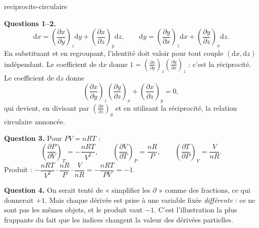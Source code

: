\begin{exo}{reciprocite-circulaire}
\begin{solution}
\textbf{Questions 1--2.}
\[
\mathrm{d}x = \left(\frac{\partial x}{\partial y}\right)_z\mathrm{d}y + \left(\frac{\partial x}{\partial z}\right)_y\mathrm{d}z, \qquad
\mathrm{d}y = \left(\frac{\partial y}{\partial x}\right)_z\mathrm{d}x + \left(\frac{\partial y}{\partial z}\right)_x\mathrm{d}z.
\]
En substituant et en regroupant, l'identité doit valoir pour tout couple $(\mathrm{d}x, \mathrm{d}z)$ indépendant. Le coefficient de $\mathrm{d}x$ donne $1 = \left(\frac{\partial x}{\partial y}\right)_z\left(\frac{\partial y}{\partial x}\right)_z$ : c'est la réciprocité. Le coefficient de $\mathrm{d}z$ donne
\[
\left(\frac{\partial x}{\partial y}\right)_z\left(\frac{\partial y}{\partial z}\right)_x + \left(\frac{\partial x}{\partial z}\right)_y = 0,
\]
qui devient, en divisant par $\left(\frac{\partial x}{\partial z}\right)_y$ et en utilisant la réciprocité, la relation circulaire annoncée.

\textbf{Question 3.} Pour $PV = nRT$ :
\[
\left(\frac{\partial P}{\partial V}\right)_T = -\frac{nRT}{V^2}, \qquad
\left(\frac{\partial V}{\partial T}\right)_P = \frac{nR}{P}, \qquad
\left(\frac{\partial T}{\partial P}\right)_V = \frac{V}{nR}.
\]
Produit : $-\dfrac{nRT}{V^2}\cdot\dfrac{nR}{P}\cdot\dfrac{V}{nR} = -\dfrac{nRT}{PV} = -1$. \checkmark

\textbf{Question 4.} On serait tenté de « simplifier les $\partial$ » comme des fractions, ce qui donnerait $+1$. Mais chaque dérivée est prise à une variable fixée \emph{différente} : ce ne sont pas les mêmes objets, et le produit vaut $-1$. C'est l'illustration la plus frappante du fait que les indices changent la valeur des dérivées partielles.
\end{solution}
\end{exo}

